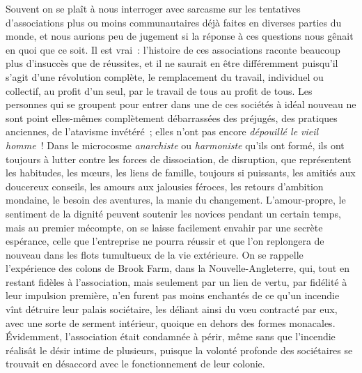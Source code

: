 \documentclass[french,twoside]{book} %
\begin{document}
Souvent on se plaît à nous interroger avec sarcasme sur les tentatives d’associations plus ou moins communautaires déjà faites en diverses parties du monde, et nous aurions peu de jugement si la  réponse à ces questions nous gênait en quoi que ce soit. Il est vrai : l’histoire de ces associations raconte beaucoup plus d’insuccès que de réussites, et il ne saurait en être différemment puisqu’il s’agit d’une révolution complète, le remplacement du travail, individuel ou collectif, au profit d’un seul, par le travail de tous au profit de tous. Les personnes qui se groupent pour entrer dans une de ces sociétés à idéal nouveau ne sont point elles-mêmes complètement débarrassées des préjugés, des pratiques anciennes, de l’atavisme invétéré ; elles n’ont pas encore \emph{dépouillé le vieil homme} ! Dans le microcosme \emph{anarchiste} ou \emph{harmoniste} qu’ils ont formé, ils ont toujours à lutter contre les forces de dissociation, de disruption,  que représentent les habitudes, les mœurs, les liens de famille, toujours si puissants, les amitiés aux doucereux conseils, les amours aux jalousies féroces, les retours d’ambition mondaine, le besoin des aventures, la manie du changement. L’amour-propre, le sentiment de la dignité peuvent soutenir les novices pendant un certain temps, mais au premier mécompte, on se laisse facilement envahir par une secrète espérance, celle que l’entreprise ne pourra réussir et que l’on replongera de nouveau dans les flots tumultueux de la vie extérieure. On se rappelle l’expérience des colons de Brook Farm, dans la Nouvelle-Angleterre, qui, tout en restant fidèles à l’association, mais seulement par un lien de vertu, par fidélité à  leur impulsion première, n’en furent pas moins enchantés de ce qu’un incendie vînt détruire leur palais sociétaire, les déliant ainsi du vœu contracté par eux, avec une sorte de serment intérieur, quoique en dehors des formes monacales. Évidemment, l’association était condamnée à périr, même sans que l’incendie réalisât le désir intime de plusieurs, puisque la volonté profonde des sociétaires se trouvait en désaccord avec le fonctionnement de leur colonie.\par
\end{document}
